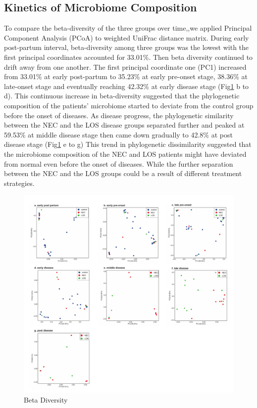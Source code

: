 \documentclass[fleqn,10pt]{wlpeerj} %
\begin{document}
    \subsection*{Kinetics of Microbiome Composition}
    To compare the beta-diversity of the three groups over time,,we applied Principal Component Analysis (PCoA) to weighted UniFrac distance matrix.
    During early post-partum interval, beta-diversity among three groups was the lowest with the first principal coordinates accounted for 33.01\%. Then beta diversity continued to drift away from one another. The first principal coordinate one (PC1) increased from 33.01\% at early post-partum to 35.23\% at early pre-onset stage, 38.36\% at late-onset stage and eventually reaching 42.32\% at early disease stage (Fig\ref{fig:pcoa} b to d).  This continuous increase in beta-diversity suggested that the phylogenetic composition of the patients’ microbiome started to deviate from the control group before the onset of diseases. As disease progress, the phylogenetic similarity between the NEC and the LOS disease groups separated further and peaked at 59.53\% at middle disease stage then came down gradually to 42.8\% at post disease stage (Fig\ref{fig:pcoa} e to g) This trend in phylogenetic dissimilarity suggested that the microbiome composition of the NEC and LOS patients might have deviated from normal even before the onset of diseases.  While the further separation between the NEC and the LOS groups could be a result of different treatment strategies.
    \begin{figure}[ht]\centering
      \includegraphics[width=\linewidth]{figure/pcoa_time_group.pdf}
      \caption{Beta Diversity}
      \label{fig:pcoa}
    \end{figure}
\end{document}
